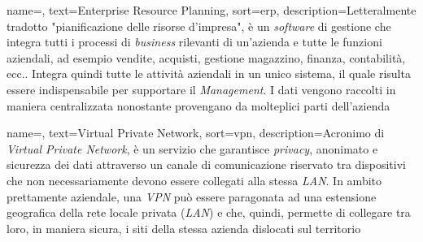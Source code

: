 {
	name=,
	text=Enterprise Resource Planning,
	sort=erp,
	description={Letteralmente tradotto "pianificazione delle risorse d'impresa", è un \textit{software} di gestione che integra tutti i processi di \textit{business} rilevanti di un'azienda e tutte le funzioni aziendali, ad esempio vendite, acquisti, gestione magazzino, finanza, contabilità, ecc.. Integra quindi tutte le attività aziendali in un unico sistema, il quale risulta essere indispensabile per supportare il \textit{Management}. I dati vengono raccolti in maniera centralizzata nonostante provengano da molteplici parti dell'azienda}
}

{
	name=,
	text=Virtual Private Network,
	sort=vpn,
	description={Acronimo di \textit{Virtual Private Network}, è un servizio che garantisce \textit{privacy}, anonimato e sicurezza dei dati attraverso un canale di comunicazione riservato tra dispositivi che non necessariamente devono essere collegati alla stessa \textit{LAN}. In ambito prettamente aziendale, una \textit{VPN} può essere paragonata ad una estensione geografica della rete locale privata (\textit{LAN}) e che, quindi, permette di collegare tra loro, in maniera sicura, i siti della stessa azienda dislocati sul territorio}
}



